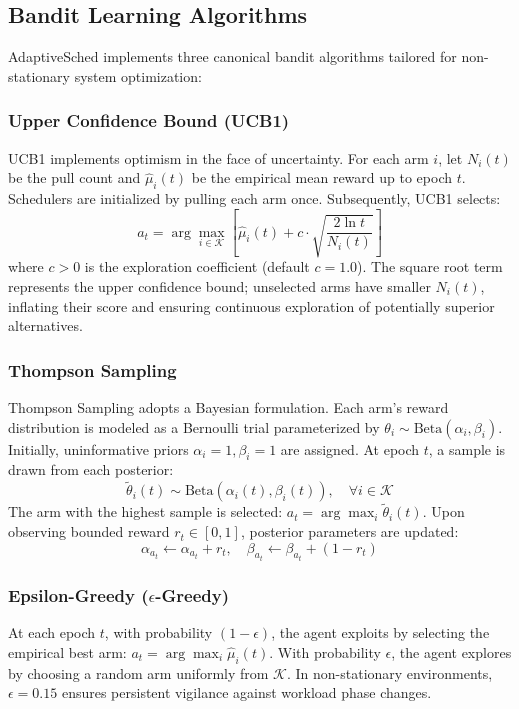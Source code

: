 \documentclass[journal]{IEEEtran}
\begin{document}
\subsection{Bandit Learning Algorithms}
AdaptiveSched implements three canonical bandit algorithms tailored for non-stationary system optimization:

\subsubsection{Upper Confidence Bound (UCB1)}
UCB1 implements optimism in the face of uncertainty. For each arm $i$, let $N_i(t)$ be the pull count and $\hat{\mu}_i(t)$ be the empirical mean reward up to epoch $t$. Schedulers are initialized by pulling each arm once. Subsequently, UCB1 selects:
\begin{equation}
a_t = \arg\max_{i \in \mathcal{K}} \left[ \hat{\mu}_i(t) + c \cdot \sqrt{\frac{2 \ln t}{N_i(t)}} \right]
\end{equation}
where $c > 0$ is the exploration coefficient (default $c = 1.0$). The square root term represents the upper confidence bound; unselected arms have smaller $N_i(t)$, inflating their score and ensuring continuous exploration of potentially superior alternatives.

\subsubsection{Thompson Sampling}
Thompson Sampling adopts a Bayesian formulation. Each arm's reward distribution is modeled as a Bernoulli trial parameterized by $\theta_i \sim \text{Beta}(\alpha_i, \beta_i)$. Initially, uninformative priors $\alpha_i = 1, \beta_i = 1$ are assigned. At epoch $t$, a sample is drawn from each posterior:
\begin{equation}
\tilde{\theta}_i(t) \sim \text{Beta}(\alpha_i(t), \beta_i(t)), \quad \forall i \in \mathcal{K}
\end{equation}
The arm with the highest sample is selected: $a_t = \arg\max_i \tilde{\theta}_i(t)$. Upon observing bounded reward $r_t \in [0, 1]$, posterior parameters are updated:
\begin{equation}
\alpha_{a_t} \leftarrow \alpha_{a_t} + r_t, \quad \beta_{a_t} \leftarrow \beta_{a_t} + (1 - r_t)
\end{equation}

\subsubsection{Epsilon-Greedy ($\epsilon$-Greedy)}
At each epoch $t$, with probability $(1 - \epsilon)$, the agent exploits by selecting the empirical best arm: $a_t = \arg\max_i \hat{\mu}_i(t)$. With probability $\epsilon$, the agent explores by choosing a random arm uniformly from $\mathcal{K}$. In non-stationary environments, $\epsilon = 0.15$ ensures persistent vigilance against workload phase changes.
\end{document}
